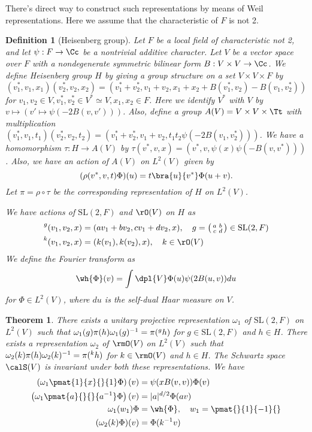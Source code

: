 \documentclass{article}
\newtheorem{theorem}{Theorem}[section]
\newtheorem{definition}{Definition}[section]
\newcommand{\pre}[1]{\prescript{#1}{}}
\newcommand{\SL}{\mathrm{SL}}
\newcommand{\smat}[4]{\left(\begin{smallmatrix} #1 & #2 \\ #3 & #4 \end{smallmatrix}\right)}
\begin{document}
There's direct way to construct such representations by means of Weil representations. Here we assume that the characteristic of $F$ is not 2. 

\begin{definition}[Heisenberg group]
Let $F$ be a local field of characteristic not 2, and let $\psi:F\to \Cc$ be a nontrivial additive character. Let $V$ be a vector space over $F$ with a nondegenerate symmetric bilinear form $B:V\times V\to \Cc$. 
We define Heisenberg group $H$ by giving a group structure on a set $V\times V\times F$ by 
$$
(v_{1}^{*}, v_{1}, x_{1}) (v_{2}^{*}, v_{2}, x_{2}) = (v_{1}^{*} + v_{2}^{*}, v_{1} + v_{2}, x_{1} + x_{2} + B(v_{1}^{*}, v_{2}) - B(v_{1}, v_{2}^{*}))
$$
for $v_1, v_2\in V, v_1^{*}, v_2^{*}\in V^{*} \simeq V, x_1, x_2\in F$. 
Here we identify $V^{*}$ with $V$ by $v\mapsto (v'\mapsto \psi(-2B(v, v')))$. 
Also, define a group $A(V) = V\times V\times \Tt$ with multiplication $(v_1^{*}, v_1, t_1)(v_2^{*}, v_2, t_2) = (v_1^{*} + v_2^{*}, v_1 + v_2, t_1 t_2 \psi(-2B(v_1, v_2^{*})))$. 
We have a homomorphism $\tau:H\to A(V)$ by $\tau(v^{*}, v, x) = (v^{*}, v, \psi(x)\psi(-B(v, v^{*})))$. 
Also, we have an action of $A(V)$ on $L^{2}(V)$ given by 
$$
(\rho(v^{*}, v, t)\Phi)(u) = t\bra{u}{v^{*}} \Phi(u+v).
$$
Let $\pi= \rho\circ \tau$ be the corresponding representation of $H$ on $L^2(V)$. 

We have actions of $\SL(2, F)$ and $\rO(V)$ on $H$ as 
\begin{align*}
\pre{g}{(v_1, v_2, x)} &= (av_1 + bv_2, cv_1 + dv_2, x), \quad g = \smat{a}{b}{c}{d}\in \SL(2, F) \\
\pre{k}{(v_1, v_2, x)} &= (k(v_1), k(v_2), x), \quad k\in \rO(V)
\end{align*}
We define the Fourier transform as 
$$
\wh{\Phi}(v) = \int\dpl{V} \Phi(u) \psi(2B(u, v))du
$$
for $\Phi\in L^{2}(V)$, where $du$ is the self-dual Haar measure on $V$.
\end{definition}
\begin{theorem}
There exists a unitary projective representation $\omega_1$ of $\SL(2, F)$ on $L^2(V)$ such that $\omega_1(g)\pi(h)\omega_1(g)^{-1} = \pi(\pre{g}{}h)$ for $g\in\SL(2, F)$ and $h\in H$. 
There exists a representation $\omega_2$ of $\rmO(V)$ on $L^{2}(V)$ such that $\omega_2(k)\pi(h)\omega_2(k)^{-1} = \pi(\pre{k}{}h)$ for $k\in \rmO(V)$ and $h\in H$. 
The Schwartz space $\calS(V)$ is invariant under both these representations. 
We have
\begin{align*}
\left(\omega_1\pmat{1}{x}{}{1}\Phi\right)(v) &=\psi(xB(v, v))\Phi(v)  \\
\left(\omega_1\pmat{a}{}{}{a^{-1}}\Phi\right)(v) &= |a|^{d/2}\Phi(av) \\
\omega_1(w_1)\Phi &= \wh{\Phi}, \quad w_1 = \pmat{}{1}{-1}{} \\
(\omega_2(k)\Phi)(v) &= \Phi(k^{-1}v)
\end{align*}
\end{theorem}
\end{document}
